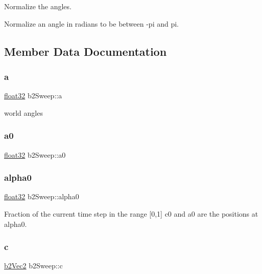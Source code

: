 Normalize the angles. 

Normalize an angle in radians to be between -\/pi and pi. 

\subsection{Member Data Documentation}
\mbox{\label{structb2_sweep_afa96bacc91dd3c92ae716a45512332d6}} 
\subsubsection{\texorpdfstring{a}{a}}
{\footnotesize\ttfamily \mbox{\hyperlink{b2_settings_8h_aacdc525d6f7bddb3ae95d5c311bd06a1}{float32}} b2\+Sweep\+::a}



world angles 

\mbox{\label{structb2_sweep_acf89c7d1223f8ab27501ff033aeac92b}} 
\subsubsection{\texorpdfstring{a0}{a0}}
{\footnotesize\ttfamily \mbox{\hyperlink{b2_settings_8h_aacdc525d6f7bddb3ae95d5c311bd06a1}{float32}} b2\+Sweep\+::a0}

\mbox{\label{structb2_sweep_aa5f8ab90178b58bc0777096cbc6b91cf}} 
\subsubsection{\texorpdfstring{alpha0}{alpha0}}
{\footnotesize\ttfamily \mbox{\hyperlink{b2_settings_8h_aacdc525d6f7bddb3ae95d5c311bd06a1}{float32}} b2\+Sweep\+::alpha0}

Fraction of the current time step in the range \mbox{[}0,1\mbox{]} c0 and a0 are the positions at alpha0. \mbox{\label{structb2_sweep_a1b5402e01b92cc82473389fc6f0375c3}} 
\subsubsection{\texorpdfstring{c}{c}}
{\footnotesize\ttfamily \mbox{\hyperlink{structb2_vec2}{b2\+Vec2}} b2\+Sweep\+::c}




